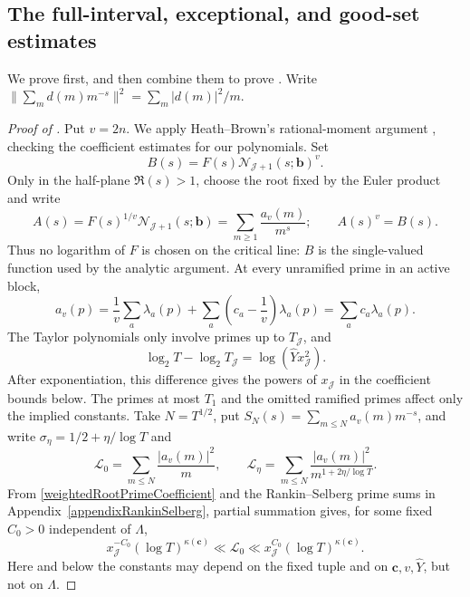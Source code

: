\documentclass[oneside, 12pt]{amsart}
\theoremstyle{definition}
\begin{document}
{		\subsection{The full-interval, exceptional, and good-set estimates}
		
		We prove 
		first, and then combine them to prove
		.  Write
		$\|\sum_m d(m)m^{-s}\|^2=\sum_m|d(m)|^2/m$.
		
		\begin{proof}[Proof of ]
			Put $v=2n$.  We apply Heath--Brown's rational-moment argument
			\cite[Sections~2--5]{Heath-Brown1}, checking the coefficient estimates
			for our polynomials.
			Set
			\[
			B(s)=F(s)\mathcal N_{\mathscr J+1}(s;\boldsymbol b)^v.
			\]
			Only in the half-plane $\Re(s)>1$, choose the root fixed by the Euler
			product and write
			\[
			A(s)=F(s)^{1/v}\mathcal N_{\mathscr J+1}(s;\boldsymbol b)
			=\sum_{m\geq1}\frac{a_v(m)}{m^s};
			\qquad A(s)^v=B(s).
			\]
			Thus no logarithm of $F$ is chosen on the critical line: $B$ is the
			single-valued function used by the analytic argument.  At every
			unramified prime in an active block,
			\begin{equation}\label{weightedRootPrimeCoefficient}
				a_v(p)=\frac1v\sum_a\lambda_a(p)
				+\sum_a\left(c_a-\frac1v\right)\lambda_a(p)
				=\sum_ac_a\lambda_a(p).
			\end{equation}
			The Taylor polynomials only involve primes up to $T_{\mathscr J}$, and
			\[
			\log_2T-\log_2T_{\mathscr J}=\log(\widehat Yx_{\mathscr J}^2).
			\]
			After exponentiation, this difference gives the powers of
			$x_{\mathscr J}$ in the coefficient bounds below. The primes at most
			$T_1$ and the omitted ramified primes affect only the implied constants.
			Take $N=T^{1/2}$, put
			$S_N(s)=\sum_{m\leq N}a_v(m)m^{-s}$, and write
			$\sigma_\eta=1/2+\eta/\log T$ and
			\[
			\mathscr L_0=\sum_{m\leq N}\frac{|a_v(m)|^2}{m},
			\qquad
			\mathscr L_\eta=\sum_{m\leq N}
			\frac{|a_v(m)|^2}{m^{1+2\eta/\log T}}.
			\]
			From \eqref{weightedRootPrimeCoefficient} and the Rankin--Selberg prime
			sums in Appendix~\ref{appendixRankinSelberg}, partial summation gives,
			for some fixed $C_0>0$ independent of $\Lambda$,
			\begin{equation}\label{HBRootCoefficientCritical}
				x_{\mathscr J}^{-C_0}(\log T)^{\kappa(\boldsymbol c)}
				\ll \mathscr L_0
				\ll x_{\mathscr J}^{C_0}
				(\log T)^{\kappa(\boldsymbol c)}.
			\end{equation}
			Here and below the constants may depend on the fixed tuple and on
			$\boldsymbol c,v,\widehat Y$, but not on $\Lambda$.
			

\end{proof}}
\end{document}
